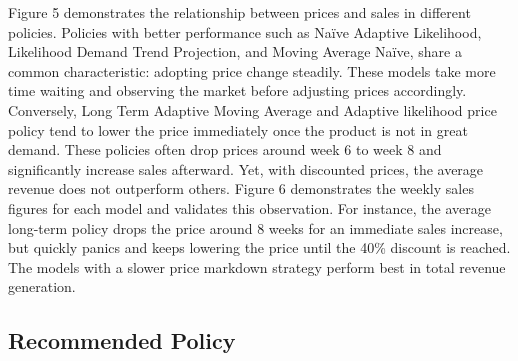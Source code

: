\documentclass[11pt,a4paper]{article}
\begin{document}
Figure 5 demonstrates the relationship between prices and sales in different policies. 
Policies with better performance such as Naïve Adaptive Likelihood, Likelihood Demand Trend Projection, and Moving Average Naïve, share a common characteristic: adopting price change steadily. 
These models take more time waiting and observing the market before adjusting prices accordingly. 
Conversely, Long Term Adaptive Moving Average and Adaptive likelihood price policy tend to lower the price immediately once the product is not in great demand. 
These policies often drop prices around week 6 to week 8 and significantly increase sales afterward. 
Yet, with discounted prices, the average revenue does not outperform others. 
Figure 6 demonstrates the weekly sales figures for each model and validates this observation. 
For instance, the average long-term policy drops the price around 8 weeks for an immediate sales increase, but quickly panics and keeps lowering the price until the 40\% discount is reached. 
The models with a slower price markdown strategy perform best in total revenue generation. 

\subsection{Recommended Policy}

\pagebreak


\end{document}
